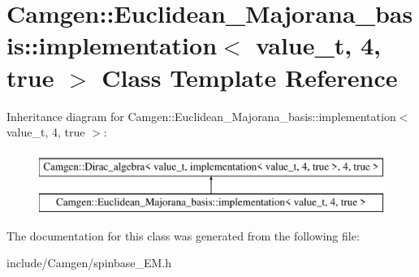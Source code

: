 \hypertarget{a00299}{\section{Camgen\-:\-:Euclidean\-\_\-\-Majorana\-\_\-basis\-:\-:implementation$<$ value\-\_\-t, 4, true $>$ Class Template Reference}
\label{a00299}
}
Inheritance diagram for Camgen\-:\-:Euclidean\-\_\-\-Majorana\-\_\-basis\-:\-:implementation$<$ value\-\_\-t, 4, true $>$\-:\begin{figure}[H]
\begin{center}
\leavevmode
\includegraphics[height=2.000000cm]{a00299}
\end{center}
\end{figure}


The documentation for this class was generated from the following file\-:\begin{DoxyCompactItemize}
\item 
include/\-Camgen/spinbase\-\_\-\-E\-M.\-h\end{DoxyCompactItemize}
